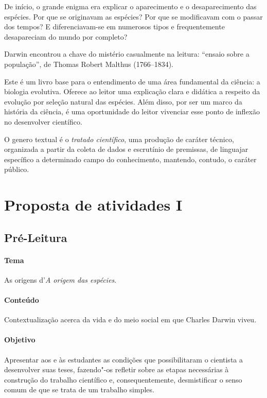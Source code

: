 \documentclass[12pt]{extarticle}
\begin{document}
De início, o grande enigma era explicar o aparecimento e o desaparecimento das
espécies. Por que se originavam as espécies? Por que se modificavam com o passar dos tempos? E diferenciavam-se em numerosos tipos e frequentemente desapareciam do mundo por completo?

Darwin encontrou a chave do mistério  casualmente na leitura: ``ensaio sobre
a população'', de Thomas Robert Malthus (1766--1834).

Este é um livro base para o entendimento de uma área fundamental da ciência:
a biologia evolutiva.
Oferece ao leitor uma explicação clara e didática a respeito da evolução por
seleção natural das espécies.
Além disso,  por ser um marco da história da ciência, é uma oportunidade do
leitor vivenciar esse ponto de inflexão no desenvolver científico.



O genero textual  é o \textit{tratado científico}, uma produção de caráter
técnico,  organizada a partir da coleta de dados e escrutínio de premissas, de
linguajar específico a determinado campo do conhecimento,  mantendo, contudo,
o caráter público.


\section{Proposta de atividades I}


\subsection{Pré-Leitura}

\paragraph{Tema} As origens d'\textit{A origem das espécies}.

\paragraph{Conteúdo} Contextualização acerca da vida e do meio social
em que Charles Darwin viveu.

\paragraph{Objetivo} Apresentar aos e às estudantes as condições
que possibilitaram o cientista a desenvolver suas teses, fazendo"-os
refletir sobre as etapas necessárias à construção do trabalho científico
e, consequentemente, desmistificar o senso comum de que se trata de 
um trabalho simples.
\end{document}
